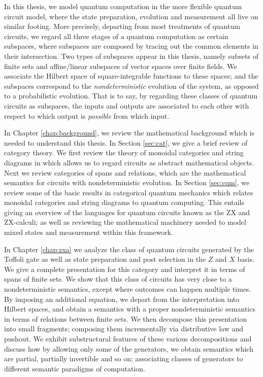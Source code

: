 \documentclass[12pt]{ociamthesis}  %
\begin{document}
In this thesis, we model quantum computation in the more flexible quantum circuit model, where the state preparation, evolution and measurement all live on similar footing.  More precisely, departing from most treatments of quantum circuits, we regard all three stages of a quantum computation as certain subspaces, where subspaces are composed by tracing out the common elements in their intersection.  Two types of subspaces appear in this thesis, namely subsets of finite sets and affine/linear subspaces of vector spaces over finite fields.  We associate the Hilbert space of square-integrable functions to these spaces; and the subspaces correspond to the {\em nondeterministic} evolution of the system, as opposed to a probabilistic evolution.  That is to say, by regarding these classes of quantum circuits as subspaces, the inputs and outputs are associated to each other with respect to which output is {\em possible} from which input.

In Chapter \ref{chap:background}, we review the mathematical background which is needed to understand this thesis.  In Section \ref{sec:cat}, we give a brief review of category theory.  We first review the theory of monoidal categories and string diagrams in which allows us to regard circuits as abstract mathematical objects.  Next we review categories of spans and relations, which are the mathematical semantics for circuits with nondeterministic evolution.  In Section \ref{sec:cqm}, we review some of the basic results in categorical quantum mechanics which relates monoidal categories and string diagrams to quantum computing. This entails giving an overview of the languages for quantum circuits known as the  ZX and ZX-calculi; as well as reviewing the mathematical machinery needed to model mixed states and measurement within this framework.

In Chapter \ref{chap:zxa} we analyze the class of quantum circuits generated by the Toffoli gate as well as state preparation and post selection in the $Z$ and $X$ basis.  We give a complete presentation for this category and interpret it in terms of spans of finite sets.  We show that this class of circuits has very close to a nondeterministic semantics, except where outcomes can happen multiple times.  By imposing an additional equation, we depart from the interpretation into Hilbert spaces, and obtain a semantics with a proper  nondeterministic semantics in terms of relations between finite sets. We then decompose this presentation into small fragments; composing them incrementally via distributive law and pushout.
We exhibit substructural features of these various decompositions and discuss how by allowing only some of the generators, we obtain semantics which are partial, partially invertible and so on; associating classes of generators to different semantic paradigms of computation.
\end{document}
